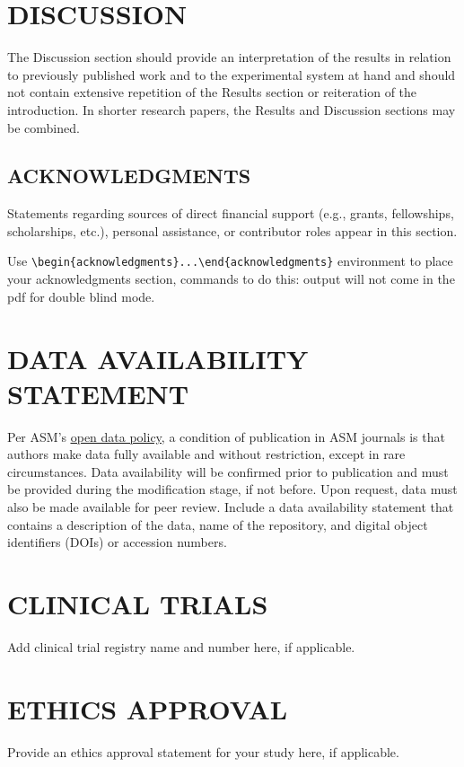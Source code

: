 \documentclass{asmarticle}
\begin{document}
\section{DISCUSSION}
	The Discussion section should provide an interpretation of the results in relation to previously published work and to the experimental system at hand and should not contain extensive repetition of the Results section or reiteration of the introduction. In shorter research papers, the Results and Discussion sections may be combined.

\begin{acknowledgments}
\section{ACKNOWLEDGMENTS}
	Statements regarding sources of direct financial support (e.g., grants, fellowships, scholarships, etc.), personal assistance, or contributor roles appear in this section.

Use \verb|\begin{acknowledgments}...\end{acknowledgments}| environment to place your acknowledgments section, commands to do this: output will not come in the pdf for double blind mode.
\end{acknowledgments}


\section{DATA AVAILABILITY STATEMENT}
	Per ASM's \href{https://journals.asm.org/open-data-policy}{\underline{open data policy}}, a condition of publication in ASM journals is that authors make data fully available and without restriction, except in rare circumstances. Data availability will be confirmed prior to publication and must be provided during the modification stage, if not before. Upon request, data must also be made available for peer review. Include a data availability statement that contains a description of the data, name of the repository, and digital object identifiers (DOIs) or accession numbers.

\section{CLINICAL TRIALS}
	Add clinical trial registry name and number here, if applicable.

\section{ETHICS APPROVAL}
	Provide an ethics approval statement for your study here, if applicable. 
\end{document}
